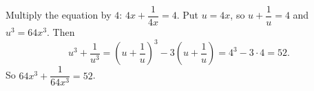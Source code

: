 Multiply the equation by $4$: $4x+\dfrac{1}{4x}=4$. Put $u=4x$, so $u+\dfrac{1}{u}=4$ and $u^3=64x^3$. Then
\[
u^3+\dfrac{1}{u^3}=\left(u+\dfrac{1}{u}\right)^3-3\left(u+\dfrac{1}{u}\right)=4^3-3\cdot4=52 .
\]
So $64x^3+\dfrac{1}{64x^3}=\boxed{52}$.
